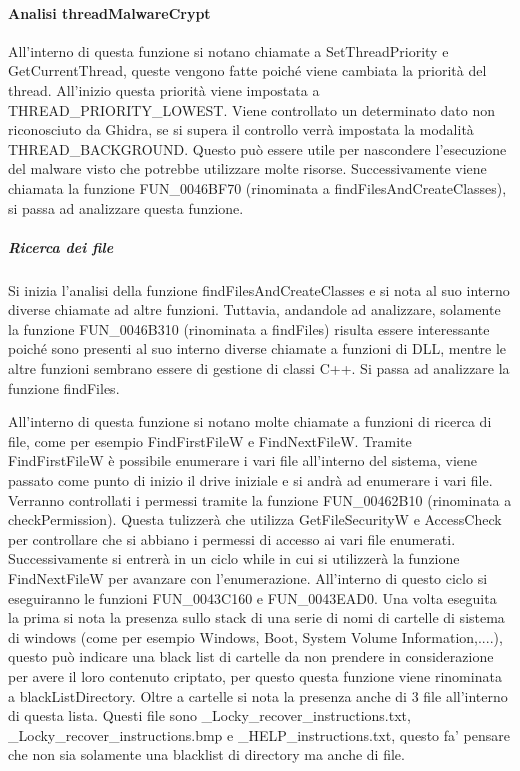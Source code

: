 \documentclass[a4paper,12pt]{article}
\begin{document}
\paragraph{Analisi threadMalwareCrypt}
All'interno di questa funzione si notano chiamate a SetThreadPriority e GetCurrentThread, queste vengono fatte poiché viene cambiata la priorità del thread. All'inizio questa priorità viene impostata a THREAD\_PRIORITY\_LOWEST. Viene controllato un determinato dato non riconosciuto da Ghidra, se si supera il controllo verrà impostata la modalità THREAD\_BACKGROUND. Questo può essere utile per nascondere l'esecuzione del malware visto che potrebbe utilizzare molte risorse. Successivamente viene chiamata la funzione FUN\_0046BF70 (rinominata a findFilesAndCreateClasses), si passa ad analizzare questa funzione.

\subparagraph{Ricerca dei file}
Si inizia l'analisi della funzione findFilesAndCreateClasses e si nota al suo interno diverse chiamate ad altre funzioni. Tuttavia, andandole ad analizzare, solamente la funzione FUN\_0046B310 (rinominata a findFiles) risulta essere interessante poiché sono presenti al suo interno diverse chiamate a funzioni di DLL, mentre le altre funzioni sembrano essere di gestione di classi C++. Si passa ad analizzare la funzione findFiles.

All'interno di questa funzione si notano molte chiamate a funzioni di ricerca di file, come per esempio FindFirstFileW e FindNextFileW. Tramite FindFirstFileW è possibile enumerare i vari file all'interno del sistema, viene passato come punto di inizio il drive iniziale e si andrà ad enumerare i vari file. Verranno controllati i permessi tramite la funzione FUN\_00462B10 (rinominata a checkPermission). Questa tulizzerà che utilizza GetFileSecurityW e AccessCheck per controllare che si abbiano i permessi di accesso ai vari file enumerati. Successivamente si entrerà in un ciclo while in cui si utilizzerà la funzione FindNextFileW per avanzare con l'enumerazione. All'interno di questo ciclo si eseguiranno le funzioni FUN\_0043C160 e FUN\_0043EAD0. Una volta eseguita la prima si nota la presenza sullo stack di una serie di nomi di cartelle di sistema di windows (come per esempio Windows, Boot, System Volume Information,....), questo può indicare una black list di cartelle da non prendere in considerazione per avere il loro contenuto criptato, per questo questa funzione viene rinominata a blackListDirectory. Oltre a cartelle si nota la presenza anche di 3 file all'interno di questa lista. Questi file sono \_Locky\_recover\_instructions.txt, \_Locky\_recover\_instructions.bmp e \_HELP\_instructions.txt, questo fa' pensare che non sia solamente una blacklist di directory ma anche di file.
\end{document}
